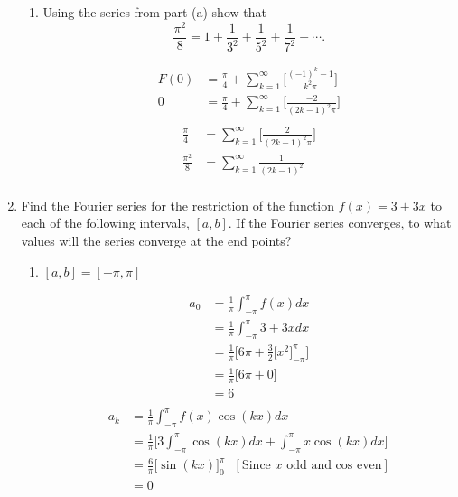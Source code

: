\documentclass{article}
\begin{document}
\begin{enumerate}
\begin{enumerate}
\item Using the series from part (a) show that 
\[
\frac{\pi^2}{8} = 1 + \frac{1}{3^2} + \frac{1}{5^2} + \frac{1}{7^2} + \cdots .
\]

\begin{multicols}{2}
\noindent
\begin{align*}
        F(0) &= \frac{\pi}{4} + \sum^{\infty}_{k=1}\Bigg[ \frac{(-1)^k-1}{k^2\pi} \Bigg] \\ 
        0 &= \frac{\pi}{4} + \sum^{\infty}_{k=1}\Bigg[ \frac{-2}{(2k - 1)^2\pi} \Bigg] \\
        \end{align*}
        \begin{align*}
         \frac{\pi}{4} &= \sum^{\infty}_{k=1}\Bigg[ \frac{2}{(2k - 1)^2\pi} \Bigg] \\
         \frac{\pi^2}{8} &= \sum^{\infty}_{k=1} \frac{1}{(2k - 1)^2} \\
\end{align*}
\end{multicols}
\end{enumerate}
\newpage
\item Find the Fourier series for the restriction of the function $f(x) = 3 + 3x$ to each of the following intervals, $[a,b]$. If the Fourier series converges, to what values will the series converge at the end points?
\begin{enumerate}
\item $[a,b] = [-\pi, \pi] $
\begin{multicols}{2}
\noindent
\begin{align*}
    a_0 &= \frac{1}{\pi} \int_{-\pi}^{\pi}f(x) dx \\
    &= \frac{1}{\pi} \int_{-\pi}^{\pi}3 + 3x dx \\
    &= \frac{1}{\pi} \Bigg[6\pi +  \frac{3}{2}\Big[x^2\Big]^{\pi}_{-\pi}\Bigg] \\
    &= \frac{1}{\pi} \Bigg[6\pi + 0 \Bigg] \\
    &= 6\\
\end{align*}
\begin{align*}
    a_k &= \frac{1}{\pi} \int_{-\pi}^{\pi}f(x)\cos(kx) dx \\
    &= \frac{1}{\pi}\Bigg[ 3\int_{-\pi}^{\pi}\cos(kx) dx + \int_{-\pi}^{\pi}x\cos(kx) dx \Bigg] \\
    &= \frac{6}{\pi}\Big[\sin(kx)\Big]_{0}^{\pi} \: \: \: [\text{Since $x$ odd and cos even}] \\
    &= 0
\end{align*}

\end{multicols}
\end{enumerate}
\end{enumerate}
\end{document}
